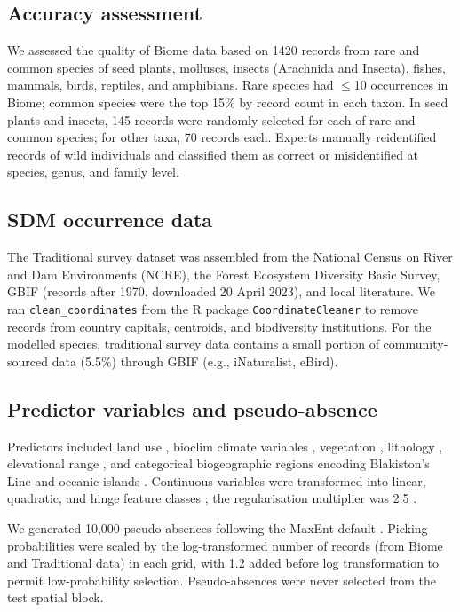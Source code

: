 \documentclass[11pt]{article}
\begin{document}
\subsection{Accuracy assessment}
We assessed the quality of Biome data based on 1420 records from rare and common species of seed plants, molluscs, insects (Arachnida and Insecta), fishes, mammals, birds, reptiles, and amphibians. Rare species had $\leq$10 occurrences in Biome; common species were the top 15\% by record count in each taxon. In seed plants and insects, 145 records were randomly selected for each of rare and common species; for other taxa, 70 records each. Experts manually reidentified records of wild individuals and classified them as correct or misidentified at species, genus, and family level.

\subsection{SDM occurrence data}
The Traditional survey dataset was assembled from the National Census on River and Dam Environments (NCRE), the Forest Ecosystem Diversity Basic Survey, GBIF (records after 1970, downloaded 20 April 2023), and local literature. We ran \texttt{clean\_coordinates} from the R package \texttt{CoordinateCleaner} to remove records from country capitals, centroids, and biodiversity institutions. For the modelled species, traditional survey data contains a small portion of community-sourced data (5.5\%) through GBIF (e.g., iNaturalist, eBird).

\subsection{Predictor variables and pseudo-absence}
Predictors included land use \citep{newbold2015}, bioclim climate variables \citep{booth2014}, vegetation \citep{abe2018}, lithology \citep{ott2020}, elevational range \citep{udy2021}, and categorical biogeographic regions encoding Blakiston's Line \citep{dobson1994,saitoh2015} and oceanic islands \citep{wepfer2016,yamasaki2017}. Continuous variables were transformed into linear, quadratic, and hinge feature classes \citep{phillips2017}; the regularisation multiplier was 2.5 \citep{elith2010,moreno2015}.

We generated 10,000 pseudo-absences following the MaxEnt default \citep{elith2011}. Picking probabilities were scaled by the log-transformed number of records (from Biome and Traditional data) in each grid, with 1.2 added before log transformation to permit low-probability selection. Pseudo-absences were never selected from the test spatial block.
\end{document}
